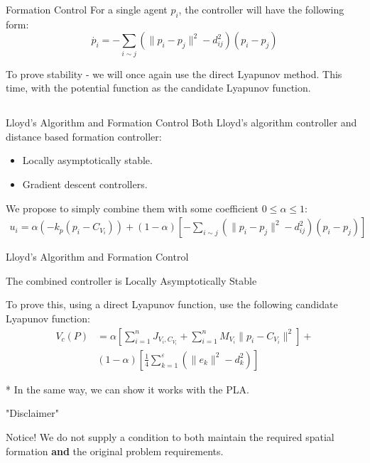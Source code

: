 \documentclass[t]{beamer}
\newcommand{\norm}[1]{\lVert #1 \rVert}
\begin{document}
\begin{frame}[label=distanceformation3]{Formation Control}
For a single agent $p_i$, the controller will have the following form:
\begin{equation*}
    \dot{p_{i}} = -\sum_{i \sim j} \left( \norm{p_{i} - p_{j}}^{2} - d_{ij}^2 \right) \left( p_{i} - p_{j} \right)
    \label{formation controller}
\end{equation*}

To prove stability - we will once again use the direct Lyapunov method. This time, with the potential function as the candidate Lyapunov function.

\end{frame}

\subsection[Lloyd's Algorithm and Formation Control]{}
\begin{frame}[label=lloydsandformation1]{Lloyd's Algorithm and Formation Control}
Both Lloyd's algorithm controller and distance based formation controller:
\begin{itemize}
\item Locally asymptotically stable.
\item Gradient descent controllers.
\end{itemize} 
We propose to simply combine them with some coefficient $0 \leq \alpha \leq 1$:
\begin{align*}
    u_{i} = \alpha \left(-k_{p}\left( p_i -C_{V_{i}} \right)\right) +
    \left( 1-\alpha \right)\left[-\sum_{i \sim j} \left( \norm{p_{i} - p_{j}}^{2} - d_{ij}^2 \right) \left( p_{i} - p_{j} \right)  \right] 
    \label{Combined Controller}
\end{align*}
\end{frame}
\begin{frame}[label=lloydsandformation2]{Lloyd's Algorithm and Formation Control}
\begin{theorem}
The combined controller is Locally Asymptotically Stable
\end{theorem}

To prove this, using a direct Lyapunov function, use the following candidate Lyapunov function:
\begin{align*}
        V_{c}\left(P\right) &= \alpha\left[ \sum_{i=1}^{n} J_{V_i,C_{V_i}} + \sum_{i=1}^{n} M_{V_i} \norm{p_i - C_{V_i}}^2 \right] +\\
        &(1-\alpha) \left[ \frac{1}{4}\sum_{k=1}^{\varepsilon}\left( \norm{e_k}^2 - d_{k}^{2} \right) \right]
\end{align*}

* In the same way, we can show it works with the PLA.
\end{frame}
\begin{frame}[label=lloydsandformation3]{"Disclaimer"}
\begin{alertblock}{Notice!}
We do not supply a condition to both maintain the required spatial formation \textbf{and} the original problem requirements.
\end{alertblock}
\end{frame}
\end{document}
